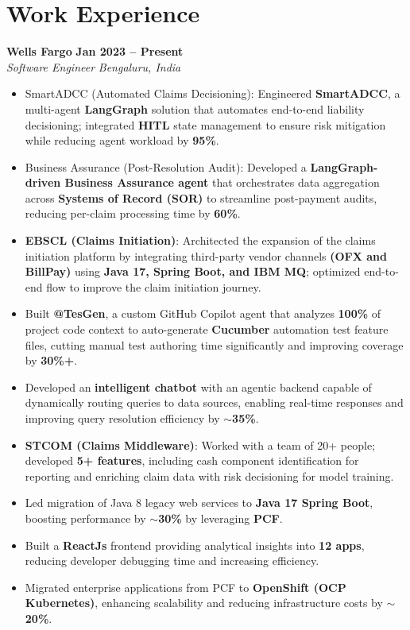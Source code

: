 \documentclass[10pt,a4paper,sans]{moderncv}
\begin{document}
\section{Work Experience}

\noindent
\textbf{Wells Fargo} \hfill \textbf{Jan 2023 -- Present} \\
\textit{Software Engineer} \hfill \textit{Bengaluru, India}
\begin{itemize}
    \item SmartADCC (Automated Claims Decisioning): Engineered \textbf{SmartADCC}, a multi-agent \textbf{LangGraph} solution that automates end-to-end liability decisioning; integrated \textbf{HITL} state management to ensure risk mitigation while reducing agent workload by \textbf{95\%}.
    \item Business Assurance (Post-Resolution Audit): Developed a \textbf{LangGraph-driven Business Assurance agent} that orchestrates data aggregation across \textbf{Systems of Record (SOR)} to streamline post-payment audits, reducing per-claim processing time by \textbf{60\%}. 
    \item \textbf{EBSCL (Claims Initiation)}: Architected the expansion of the claims initiation platform by integrating third-party vendor channels \textbf{(OFX and BillPay)} using \textbf{Java 17, Spring Boot, and IBM MQ}; optimized end-to-end flow to improve the claim initiation journey.
    \item Built \textbf{@TesGen}, a custom GitHub Copilot agent that analyzes \textbf{100\%} of project code context to auto-generate \textbf{Cucumber} automation test feature files, cutting manual test authoring time significantly and improving coverage by \textbf{30\%+}.
    \item Developed an \textbf{intelligent chatbot} with an agentic backend capable of dynamically routing queries to data sources, enabling real-time responses and improving query resolution efficiency by \textbf{$\sim$35\%}.
    \item \textbf{STCOM (Claims Middleware)}: Worked with a team of 20+ people; developed \textbf{5+ features}, including cash component identification for reporting and enriching claim data with risk decisioning for model training.
    \item Led migration of Java 8 legacy web services to \textbf{Java 17 Spring Boot}, boosting performance by \textbf{$\sim$30\%} by leveraging \textbf{PCF}.
    \item Built a \textbf{ReactJs} frontend providing analytical insights into \textbf{12 apps}, reducing developer debugging time and increasing efficiency.
    \item Migrated enterprise applications from PCF to \textbf{OpenShift (OCP Kubernetes)}, enhancing scalability and reducing infrastructure costs by \textbf{$\sim$20\%}.
\end{itemize}
\end{document}

